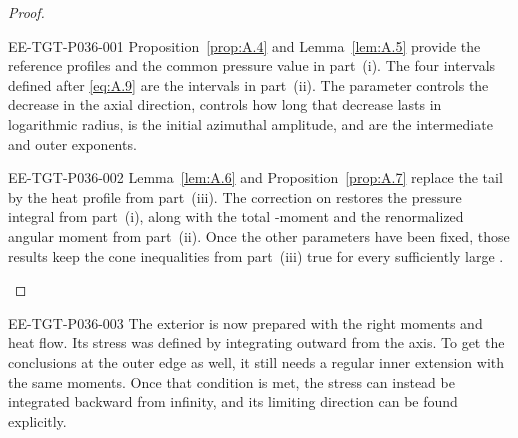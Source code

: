 %
\begin{proof}
\begin{EESegment}{EE-TGT-P036-001}
Proposition~\ref{prop:A.4} and Lemma~\ref{lem:A.5} provide the reference
profiles and the common pressure value in part~(i). The four intervals
defined after \eqref{eq:A.9} are the intervals in part~(ii). The parameter
 controls the decrease in the axial direction,
 controls how long that decrease lasts in logarithmic
radius,  is the initial azimuthal amplitude, and
 are the intermediate and outer exponents.
\end{EESegment}

\begin{EESegment}{EE-TGT-P036-002}
Lemma~\ref{lem:A.6} and Proposition~\ref{prop:A.7} replace the tail by the
heat profile from part~(iii). The correction on
 restores the pressure integral from
part~(i), along with the total -moment and the
renormalized angular moment from part~(ii). Once the other parameters have
been fixed, those results keep the cone inequalities from part~(iii) true
for every sufficiently large .
\end{EESegment}
\end{proof}

\begin{EESegment}{EE-TGT-P036-003}
The exterior is now prepared with the right moments and heat flow. Its stress
was defined by integrating outward from the axis. To get the conclusions at
the outer edge as well, it still needs a regular inner extension with the
same moments. Once that condition is met, the stress can instead be
integrated backward from infinity, and its limiting direction can be found
explicitly.
\end{EESegment}

